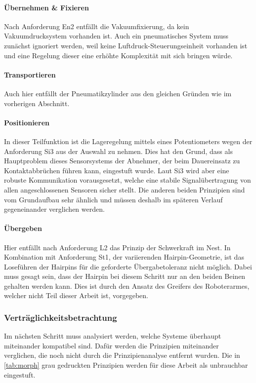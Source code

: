 \paragraph{Übernehmen \& Fixieren} Nach Anforderung En2 entfällt die Vakuumfixierung, da kein Vakuumdrucksystem vorhanden
ist. Auch ein pneumatisches System muss zunächst ignoriert werden, weil keine Luftdruck-Steuerungseinheit
vorhanden ist und eine Regelung dieser eine erhöhte Komplexität mit sich bringen würde.

\paragraph{Transportieren} Auch hier entfällt der Pneumatikzylinder aus den gleichen Gründen wie im vorherigen Abschnitt.

\paragraph{Positionieren} In dieser Teilfunktion ist die Lageregelung mittels eines Potentiometers wegen der Anforderung Si3 aus
der Auswahl zu nehmen. Dies hat den Grund, dass als Hauptproblem dieses Sensorsystems der Abnehmer, der beim Dauereinsatz zu Kontaktabbrüchen
führen kann, eingestuft wurde. Laut Si3 wird aber eine robuste Kommunikation vorausgesetzt, welche eine stabile Signalübertragung
von allen angeschlossenen Sensoren sicher stellt. Die anderen beiden Prinzipien sind vom Grundaufbau sehr ähnlich und müssen
deshalb im späteren Verlauf gegeneinander verglichen werden.

\paragraph{Übergeben} Hier entfällt nach Anforderung L2 das Prinzip der Schwerkraft im Nest. In Kombination mit Anforderung St1,
der variierenden Hairpin-Geometrie, ist das Loseführen der Hairpins für die geforderte Übergabetoleranz nicht möglich. Dabei muss
gesagt sein, dass der Hairpin bei diesem Schritt nur an den beiden Beinen gehalten werden kann. Dies ist durch den Ansatz des Greifers
des Roboterarmes, welcher nicht Teil dieser Arbeit ist, vorgegeben.

\subsubsection{Verträglichkeitsbetrachtung}\label{sec:Verträglichkeit}
Im nächsten Schritt muss analysiert werden, welche Systeme überhaupt miteinander kompatibel sind. Dafür werden die Prinzipien
miteinander verglichen, die noch nicht durch die Prinzipienanalyse entfernt wurden. Die in \cref{tab:morph} grau gedruckten Prinzipien
werden für diese Arbeit als unbrauchbar eingestuft.

